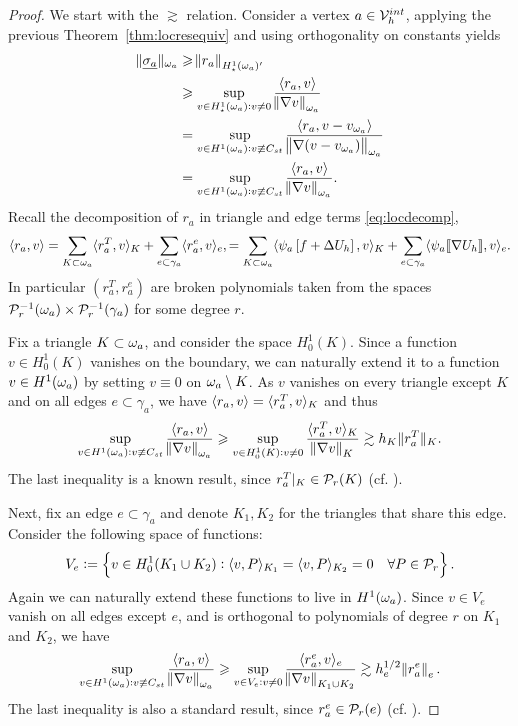 \documentclass[thesis.tex]{subfiles}
\begin{document}
\begin{proof}
  We start with the $\gtrsim$ relation.  Consider a vertex  $a \in \V_h^{int}$, applying the previous Theorem~\ref{thm:locresequiv} and using orthogonality on constants yields  
  \begin{align*}
    \uanorm{\v{\sigma_a}}_{\w_a} &\geq \norm{r_a}_{H^1_\star(\w_a)'} \\
    &\geq \sup_{v \in H^1_\star(\w_a) : v \ne 0} { \ip{r_a, v} \over \norm{\nabla v}_{\w_a}} \\
    &= \sup_{v \in H^1(\w_a) : v \not \equiv C_{st}} { \ip{r_a, v - v_{\w_a}} \over \norm{\nabla (v - v_{\w_a})}_{\w_a}} \\
          &= \sup_{v \in H^1(\w_a) : v \not \equiv C_{st}} { \ip{r_a, v} \over \norm{\nabla v}_{\w_a}}.
  \end{align*}
  Recall the decomposition of $r_a$ in triangle and edge terms \eqref{eq:locdecomp},
  \[
    \ip{r_a,v} = \sum_{K\subset \w_a} \langle{r^T_a, v}\rangle_K + \sum_{e \subset \gamma_a} \ip{r^e_a, v}_e,
    = \sum_{K\subset \w_a} \langle{\psi_a \left [f+\Delta U_h \right], v}\rangle_K + \sum_{e \subset \gamma_a} \ip{\psi_a \llbracket \nabla U_h \rrbracket, v}_e.
  \]
  In particular $(r^T_a, r^e_a)$ are broken polynomials taken from the spaces $\P_r^{-1}(\w_a)\times \P_r^{-1}(\gamma_a)$ for some degree $r$.

  Fix a triangle $K \subset \w_a$, and consider the space $H_0^1(K)$. Since a function $v \in H_0^1(K)$ vanishes on the boundary, 
  we can naturally extend it to a function $v \in H^1(\w_a)$ by setting $v \equiv 0$ on $\w_a \setminus K$. As $v$
  vanishes on every triangle except $K$ and on  all edges $e \subset \gamma_a$, we have $\ip{r_a, v} = \langle{r_a^T, v}\rangle_K$ and thus
  \[
         \sup_{v \in H^1(\w_a) : v \not \equiv C_{st}} { \ip{r_a, v} \over \norm{\nabla v}_{\w_a}} 
         \geq \sup_{v \in H_0^1(K) : v \ne 0} { \langle{r^T_a, v}\rangle_K \over \norm{\nabla v}_{K}}
         \gtrsim h_K \|{r^T_a}\|_K.
  \]
  The last inequality is a known result, since $r^T_a|_K \in \P_r(K)$ (cf. \cite[Ex~9.x.5]{brenner}).
  
  Next, fix an edge $e \subset \gamma_a$ and denote $K_1, K_2$ for the triangles that share this edge. Consider the following space of functions:
  \[
  V_e := \set{v \in H_0^1(K_1 \cup K_2) : \ip{v,P}_{K_1}= \ip{v,P}_{K_2} = 0\quad \forall P \in \P_r}.\]
  Again we can naturally extend these functions to live in $H^1(\w_a)$. Since $v \in V_e$ vanish on all edges except $e$, and
  is orthogonal to polynomials of degree $r$ on $K_1$ and $K_2$, we have
  \[
         \sup_{v \in H^1(\w_a) : v \not \equiv C_{st}} { \ip{r_a, v} \over \norm{\nabla v}_{\w_a}} 
         \geq \sup_{v \in V_e: v \ne 0} { \langle r^e_a, v \rangle_e \over \norm{\nabla v}_{K_1 \cup K_2}}
         \gtrsim h_e^{1/2} \norm{r^e_a}_e.
  \]
  The last inequality is also a standard result, since $r^e_a \in \P_r(e)$ (cf. \cite[Ex~9.x.7]{brenner}).


\end{proof}
\end{document}
